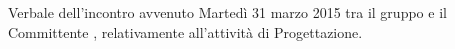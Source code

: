 Verbale dell'incontro avvenuto Martedì 31 marzo 2015 tra il gruppo \gruppo e il Committente \committenteAlt, relativamente all'attività di Progettazione.

